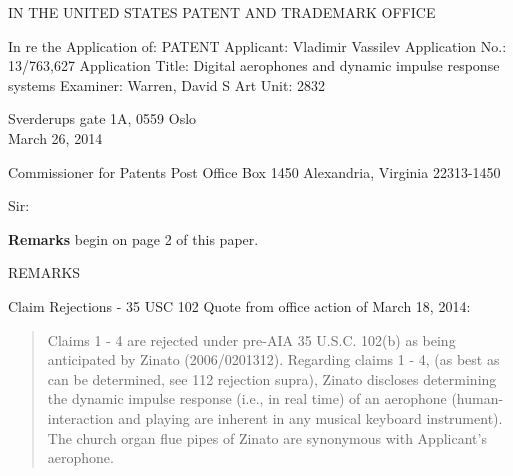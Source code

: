 
\usepackage{ulem}



IN THE UNITED STATES PATENT AND TRADEMARK OFFICE


In re the Application of: PATENT \newline
Applicant: Vladimir Vassilev \newline
Application No.: 13/763,627 \newline
Application Title: Digital aerophones and dynamic impulse response
systems \newline
Examiner: Warren, David S \newline
Art Unit: 2832 \newline


\begingroup
\setlength\parindent{3.6in}
Sverderups gate 1A, 0559 Oslo \\ March 26, 2014
\endgroup

Commissioner for Patents \newline
Post Office Box 1450 \newline
Alexandria, Virginia 22313-1450 \newline

Sir:

\textbf{Remarks} begin on page 2 of this paper.

\newpage
\begin{center}
REMARKS
\end{center}

Claim Rejections - 35 USC  102
Quote from office action of March 18, 2014:

\begin{quote}

Claims 1 - 4 are rejected under pre-AIA 35 U.S.C. 102(b) as being anticipated by
Zinato (2006/0201312). Regarding claims 1 - 4, (as best as can be determined, see
112 rejection supra), Zinato discloses determining the dynamic impulse response (i.e.,
in real time) of an aerophone (human-interaction and playing are inherent in any
musical keyboard instrument). The church organ flue pipes of Zinato are synonymous
with Applicant's aerophone.

\end{quote}



